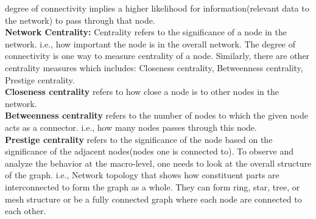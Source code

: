 degree of connectivity implies a higher likelihood for information(relevant
data to the network) to pass through that node.\\
\textbf{Network Centrality:} Centrality refers to the significance of a node in
the network. i.e., how important the node is in the overall network. The degree
of connectivity is one way to measure centrality of a node. Similarly, there
are other centrality measures which includes: Closeness centrality,
Betweenness centrality, Prestige centrality.\\ 
\textbf{Closeness centrality} refers to how close a node is to other nodes in
the network.  \\
\textbf{Betweenness centrality} refers to the number of nodes to
which the given node acts as a connector. i.e., how many nodes passes through
this node.\\
\textbf{Prestige centrality} refers to the significance of the node
based on the significance of the adjacent nodes(nodes one is connected to).  To
observe and analyze the behavior at the macro-level, one needs to look at the
overall structure of the graph. i.e., Network topology that shows how
constituent parts are interconnected to form the graph as a whole. They can
form ring, star, tree, or mesh structure or be a fully connected graph where
each node are connected to each other. 

